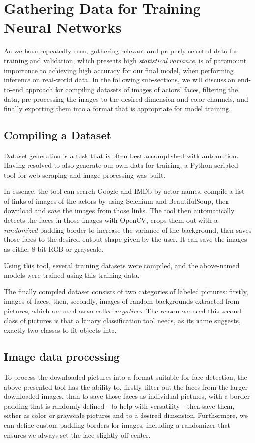 \section{Gathering Data for Training Neural Networks}
As we have repeatedly seen, gathering relevant and properly selected data for training and validation, which presents high \textit{statistical variance}, is of paramount importance to achieving high accuracy for our final model, when performing inference on real-world data.  In the following sub-sections, we will discuss an end-to-end approach for compiling datasets of images of actors' faces, filtering the data, pre-processing the images to the desired dimension and color channels, and finally exporting them into a format that is appropriate for model training.
\subsection{Compiling a Dataset}
Dataset generation is a task that is often best accomplished with automation. Having resolved to also generate our own data for training, a Python scripted tool for web-scraping and image processing was built. \par
In essence, the tool can search Google and IMDb by actor names, compile a list of links of images of the actors by using Selenium \cite{selenium_website} and BeautifulSoup, then download and save the images from those links. The tool then automatically detects the faces in those images with OpenCV, crops them out with a \textit{randomized} padding border to increase the variance of the background, then saves those faces to the desired output shape given by the user. It can save the images as either 8-bit RGB or grayscale. \par
Using this tool, several training datasets were compiled, and the above-named models were trained using this training data.\par
The finally compiled dataset consists of two categories of labeled pictures: firstly, images of faces, then, secondly, images of random backgrounds extracted from pictures, which are used as so-called \textit{negatives}. The reason we need this second class of pictures is that a binary classification tool needs, as its name suggests, exactly two classes to fit objects into.

\subsection{Image data processing}
To process the downloaded pictures into a format suitable for face detection, the above presented tool has the ability to, firstly, filter out the faces from the larger downloaded images, than to save those faces as individual pictures, with a border padding that is randomly defined - to help with versatility - then save them, either as color or grayscale pictures and to a desired dimension. Furthermore, we can define custom padding borders for images, including a randomizer that ensures we always set the face slightly off-center.

